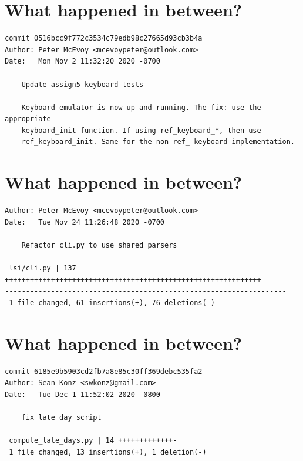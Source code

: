 \documentclass{article}
\begin{document}
\newpage




\section*{What happened in between?}
\vspace{2ex}
\begin{verbatim}
commit 0516bcc9f772c3534c79edb98c27665d93cb3b4a
Author: Peter McEvoy <mcevoypeter@outlook.com>
Date:   Mon Nov 2 11:32:20 2020 -0700

    Update assign5 keyboard tests
    
    Keyboard emulator is now up and running. The fix: use the appropriate
    keyboard_init function. If using ref_keyboard_*, then use
    ref_keyboard_init. Same for the non ref_ keyboard implementation.

\end{verbatim}

\newpage



\section*{What happened in between?}
\vspace{2ex}
\begin{verbatim}
Author: Peter McEvoy <mcevoypeter@outlook.com>
Date:   Tue Nov 24 11:26:48 2020 -0700

    Refactor cli.py to use shared parsers

 lsi/cli.py | 137 +++++++++++++++++++++++++++++++++++++++++++++++++++++++++++++----------------------------------------------------------------------------
 1 file changed, 61 insertions(+), 76 deletions(-)

\end{verbatim}

\newpage

\section*{What happened in between?}
\vspace{2ex}
\begin{verbatim}
commit 6185e9b5903cd2fb7a8e85c30ff369debc535fa2
Author: Sean Konz <swkonz@gmail.com>
Date:   Tue Dec 1 11:52:02 2020 -0800

    fix late day script

 compute_late_days.py | 14 +++++++++++++-
 1 file changed, 13 insertions(+), 1 deletion(-)

\end{verbatim}
\end{document}
